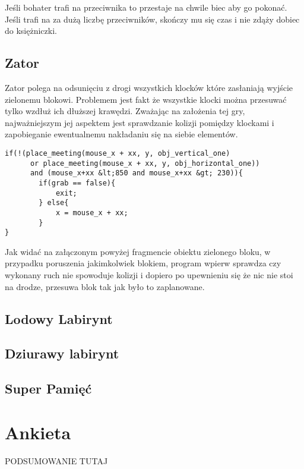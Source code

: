 \documentclass[openright]{xmgr}
\begin{document}
Jeśli bohater trafi na przeciwnika to przestaje na chwile biec aby go pokonać. Jeśli trafi na za dużą liczbę przeciwników, skończy mu się czas i nie zdąży dobiec do księżniczki.

\subsection{Zator}
Zator polega na odsunięciu z drogi wszystkich klocków które zasłaniają wyjście zielonemu blokowi. Problemem jest fakt że wszystkie klocki można przesuwać tylko wzdłuż ich dłuższej krawędzi. Zważając na założenia tej gry, najważniejszym jej aspektem jest sprawdzanie kolizji pomiędzy klockami i zapobieganie ewentualnemu nakładaniu się na siebie elementów. 

\begin{lstlisting}[caption={Fragment kodu obiektu obj\_green\_one}]
if(!(place_meeting(mouse_x + xx, y, obj_vertical_one)
      or place_meeting(mouse_x + xx, y, obj_horizontal_one)) 
      and (mouse_x+xx &lt;850 and mouse_x+xx &gt; 230)){
        if(grab == false){
            exit;
        } else{
            x = mouse_x + xx;
        }    
}
\end{lstlisting}

Jak widać na załączonym powyżej fragmencie obiektu zielonego bloku, w przypadku poruszenia jakimkolwiek blokiem, program wpierw sprawdza czy wykonany ruch nie spowoduje kolizji i dopiero po upewnieniu się że nic nie stoi na drodze, przesuwa blok tak jak było to zaplanowane.


\subsection{Lodowy Labirynt}
\subsection{Dziurawy labirynt}
\subsection{Super Pamięć}

\section{Ankieta}





\summary

PODSUMOWANIE TUTAJ
\end{document}
